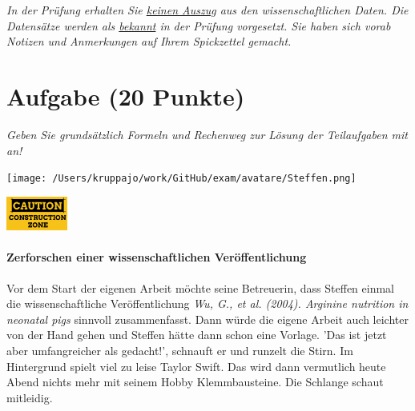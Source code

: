 \documentclass[a4paper, 9pt]{scrartcl}\usepackage[]{graphicx}\usepackage[]{xcolor}
\begin{document}
\textit{In der Prüfung erhalten Sie \underline{keinen Auszug} aus den wissenschaftlichen Daten. Die Datensätze werden als \underline{bekannt} in der Prüfung vorgesetzt. Sie haben sich vorab Notizen und Anmerkungen auf Ihrem Spickzettel gemacht.}


\clearpage

\section{Aufgabe \hfill (20 Punkte)}

\textit{Geben Sie grundsätzlich Formeln und Rechenweg zur Lösung der Teilaufgaben mit an!} \\[1Ex]
 

 
\ifcollection
\begin{flushright}
\tiny\vspace{-3Ex}
\textbf{\examinhaltstart}
\exammodulebiostat
\vspace{-4Ex}
\end{flushright}
\begin{minipage}[t]{0.5\textwidth}
\texttt{[image: /Users/kruppajo/work/GitHub/exam/avatare/Steffen.png]}
\end{minipage}
\begin{minipage}[t]{0.5\textwidth}
\hfill
\href{https://youtu.be/C9skfFRTHhI}{\includegraphics[width = 2cm]{img/caution}}
\end{minipage}
\fi



\ifcollection
\paragraph{Zerforschen einer wissenschaftlichen Veröffentlichung}
\fi

Vor dem Start der eigenen Arbeit möchte seine Betreuerin, dass Steffen einmal die wissenschaftliche Veröffentlichung \textit{Wu, G., et al. (2004). Arginine nutrition in neonatal pigs} sinnvoll zusammenfasst. Dann würde die eigene Arbeit auch leichter von der Hand gehen und Steffen hätte dann schon eine Vorlage. 'Das ist jetzt aber umfangreicher als gedacht!', schnauft er und runzelt die Stirn. Im Hintergrund spielt viel zu leise Taylor Swift. Das wird dann vermutlich heute Abend nichts mehr mit seinem Hobby Klemmbausteine. Die Schlange schaut mitleidig.\\
\end{document}
